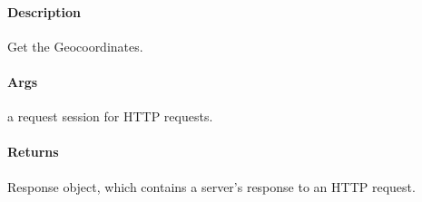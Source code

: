 \documentclass[letterpaper,10pt,english]{sphinxmanual}
\begin{document}
\begin{fulllineitems}
\label{\detokenize{gemini_lidar_hub_API:gemini_lidar_hub_API.get_lidar_hub_world_coordinates}}
\pysigstartsignatures
{}
\pysigstopsignatures

\paragraph{Description}
\label{\detokenize{gemini_lidar_hub_API:id35}}
\sphinxAtStartPar
Get the Geo\sphinxhyphen{}coordinates.


\paragraph{Args}
\label{\detokenize{gemini_lidar_hub_API:id36}}\begin{description}
\sphinxAtStartPar
a request session for HTTP requests.

\end{description}


\paragraph{Returns}
\label{\detokenize{gemini_lidar_hub_API:id37}}\begin{description}
\sphinxAtStartPar
Response object, which contains a server’s response to an HTTP request.

\end{description}

\end{fulllineitems}

\end{document}
